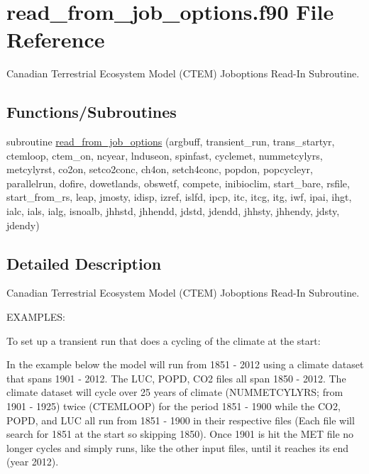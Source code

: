 \hypertarget{read__from__job__options_8f90}{}\section{read\+\_\+from\+\_\+job\+\_\+options.\+f90 File Reference}
\label{read__from__job__options_8f90}


Canadian Terrestrial Ecosystem Model (C\+T\+E\+M) Joboptions Read-\/\+In Subroutine.  


\subsection*{Functions/\+Subroutines}
\begin{DoxyCompactItemize}
\item 
subroutine \hyperlink{read__from__job__options_8f90_a20cec43eab235567e47a309edb57d040}{read\+\_\+from\+\_\+job\+\_\+options} (argbuff, transient\+\_\+run, trans\+\_\+startyr, ctemloop, ctem\+\_\+on, ncyear, lnduseon, spinfast, cyclemet, nummetcylyrs, metcylyrst, co2on, setco2conc, ch4on, setch4conc, popdon, popcycleyr, parallelrun, dofire, dowetlands, obswetf, compete, inibioclim, start\+\_\+bare, rsfile, start\+\_\+from\+\_\+rs, leap, jmosty, idisp, izref, islfd, ipcp, itc, itcg, itg, iwf, ipai, ihgt, ialc, ials, ialg, isnoalb, jhhstd, jhhendd, jdstd, jdendd, jhhsty, jhhendy, jdsty, jdendy)
\end{DoxyCompactItemize}


\subsection{Detailed Description}
Canadian Terrestrial Ecosystem Model (C\+T\+E\+M) Joboptions Read-\/\+In Subroutine. 

E\+X\+A\+M\+P\+L\+E\+S\+:

To set up a transient run that does a cycling of the climate at the start\+:

In the example below the model will run from 1851 -\/ 2012 using a climate dataset that spans 1901 -\/ 2012. The L\+U\+C, P\+O\+P\+D, C\+O2 files all span 1850 -\/ 2012. The climate dataset will cycle over 25 years of climate (N\+U\+M\+M\+E\+T\+C\+Y\+L\+Y\+R\+S; from 1901 -\/ 1925) twice (C\+T\+E\+M\+L\+O\+O\+P) for the period 1851 -\/ 1900 while the C\+O2, P\+O\+P\+D, and L\+U\+C all run from 1851 -\/ 1900 in their respective files (Each file will search for 1851 at the start so skipping 1850). Once 1901 is hit the M\+E\+T file no longer cycles and simply runs, like the other input files, until it reaches its end (year 2012).

